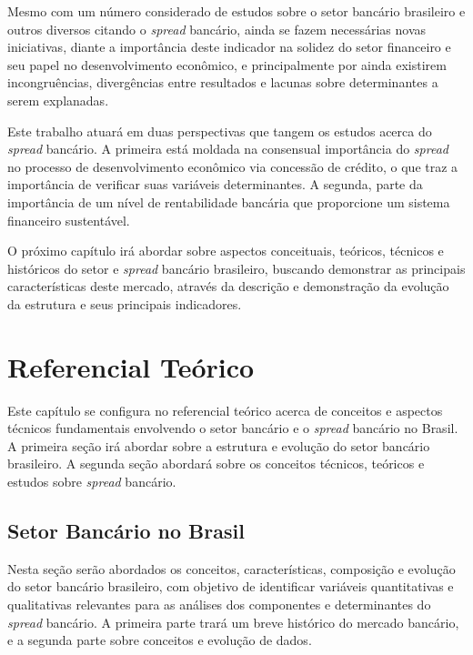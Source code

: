 \documentclass[
  12pt,
  12pt,
  openright,
  oneside,
  a4paper,
  chapter=TITLE,
  section=TITLE,
  subsection=TITLE,
  subsubsection=TITLE,
  english,
  portugues,
  sumario=tradicional]{abntex2}
\begin{document}
Mesmo com um número considerado de estudos sobre o setor bancário brasileiro e outros diversos citando o \emph{spread} bancário, ainda se fazem necessárias novas iniciativas, diante a importância deste indicador na solidez do setor financeiro e seu papel no desenvolvimento econômico, e principalmente por ainda existirem incongruências, divergências entre resultados e lacunas sobre determinantes a serem explanadas.

Este trabalho atuará em duas perspectivas que tangem os estudos acerca do \emph{spread} bancário. A primeira está moldada na consensual importância do \emph{spread} no processo de desenvolvimento econômico via concessão de crédito, o que traz a importância de verificar suas variáveis determinantes. A segunda, parte da importância de um nível de rentabilidade bancária que proporcione um sistema financeiro sustentável.

O próximo capítulo irá abordar sobre aspectos conceituais, teóricos, técnicos e históricos do setor e \emph{spread} bancário brasileiro, buscando demonstrar as principais características deste mercado, através da descrição e demonstração da evolução da estrutura e seus principais indicadores.

\textual
\pagestyle{simple}

\parindent 1.50cm

\chapter{Referencial Teórico}

Este capítulo se configura no referencial teórico acerca de conceitos e aspectos técnicos fundamentais envolvendo o setor bancário e o \emph{spread} bancário no Brasil. A primeira seção irá abordar sobre a estrutura e evolução do setor bancário brasileiro. A segunda seção abordará sobre os conceitos técnicos, teóricos e estudos sobre \emph{spread} bancário.

\section{Setor Bancário no Brasil}

Nesta seção serão abordados os conceitos, características, composição e evolução do setor bancário brasileiro, com objetivo de identificar variáveis quantitativas e qualitativas relevantes para as análises dos componentes e determinantes do \emph{spread} bancário. A primeira parte trará um breve histórico do mercado bancário, e a segunda parte sobre conceitos e evolução de dados.
\end{document}
